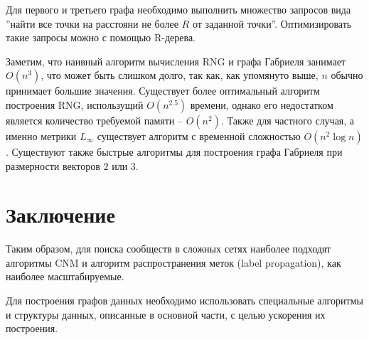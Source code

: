 \documentclass{article}
\begin{document}
Для первого и третьего графа необходимо выполнить множество запросов вида ''найти все точки на расстояни не более $R$ от заданной точки''. Оптимизировать такие запросы можно с помощью R-дерева\cite{rtree}.

Заметим, что наивный алгоритм вычисления RNG и графа Габриеля занимает $O(n^3)$, что может быть слишком долго, так как, как упомянуто выше, $n$ обычно принимает большие значения.
Существует более оптимальный алгоритм построения RNG, использущий $O(n^{2.5})$ времени\cite{all_cases_dg}, однако его недостатком является количество требуемой памяти -- $O(n^2)$. Также для частного случая, а именно метрики $L_{\infty}$ существует алгоритм с временной сложностью $O(n^2 \log n)$\cite{some_case_dg}.
Существуют также быстрые алгоритмы для построения графа Габриеля при размерности векторов $2$ или $3$\cite{some_case_gabr}.

\section*{Заключение}

Таким образом, для поиска сообществ в сложных сетях наиболее подходят алгоритмы CNM и алгоритм распространения меток (label propagation), как наиболее масштабируемые.

Для построения графов данных необходимо использовать специальные алгоритмы и структуры данных, описанные в основной части, с целью ускорения их построения.
\end{document}
